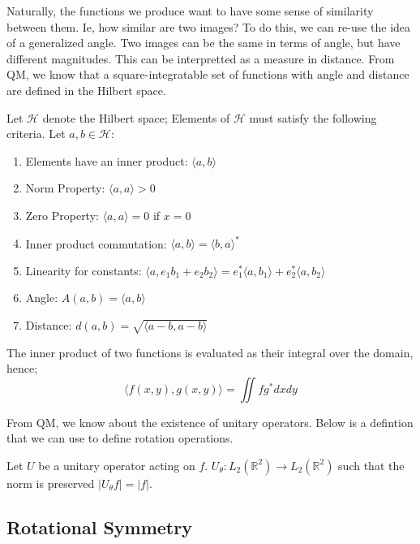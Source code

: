 Naturally, the functions we produce want to have some sense of similarity between them. Ie, how similar are two images? To do this, we can re-use the idea of a generalized angle. Two images can be the same in terms of angle, but have different magnitudes. This can be interpretted as a measure in distance. From QM, we know that a square-integratable set of functions with angle and distance are defined in the Hilbert space.
\begin{definition}
    Let $\mathscr{H}$ denote the Hilbert space; Elements of $\mathscr{H}$ must satisfy the following criteria. Let $a,b \in \mathscr{H}$:
    \begin{enumerate}
        \item Elements have an inner product: $\langle a, b \rangle$
        \item  Norm Property: $\langle a, a \rangle > 0$
        \item  Zero Property: $\langle a, a \rangle = 0$ if $x=0$
        \item Inner product commutation: $\langle a, b \rangle = \langle b, a \rangle^*$
        \item Linearity for constants: $\langle a, e_1b_1 + e_2b_2 \rangle = e_1^*\langle a, b_1 \rangle + e_2^*\langle a, b_2 \rangle$
        \item  Angle: $A(a,b) = \langle a,b \rangle$
        \item Distance: $d(a,b) = \sqrt{\langle a-b,a-b \rangle}$
    \end{enumerate}
\end{definition}

The inner product of two functions is evaluated as their integral over the domain, hence;
\begin{equation}
    \langle f(x,y), g(x,y) \rangle = \iint f g^*dx dy
\end{equation}

From QM, we know about the existence of unitary operators. Below is a defintion that we can use to define rotation operations.
\begin{definition}
    Let $U$ be a unitary operator acting on $f$. $U_\theta : L_2(\mathbb{R}^2) \rightarrow L_2(\mathbb{R}^2)$ such that the norm is preserved $|U_\theta f| = |f|$.
\end{definition}

\subsection{Rotational Symmetry}

